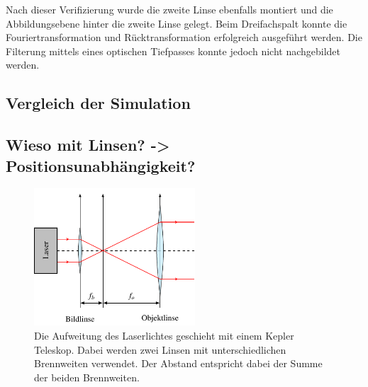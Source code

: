 Nach dieser Verifizierung wurde die zweite Linse ebenfalls montiert und die Abbildungsebene hinter die zweite Linse gelegt.
Beim Dreifachspalt konnte die Fouriertransformation und Rücktransformation erfolgreich ausgeführt werden.
Die Filterung mittels eines optischen Tiefpasses konnte jedoch nicht nachgebildet werden.

\subsection{Vergleich der Simulation}

\subsection{Wieso mit Linsen? -> Positionsunabhängigkeit?}

\begin{figure}
    \centering
    \includegraphics[width=60mm]{papers/opt/images/laserAufweiten.pdf}
    \caption{Die Aufweitung des Laserlichtes geschieht mit einem Kepler Teleskop. 
    Dabei werden zwei Linsen mit unterschiedlichen Brennweiten verwendet. 
    Der Abstand entspricht dabei der Summe der beiden Brennweiten.}
    \label{opt:fig:laserAufweiten}
\end{figure}
